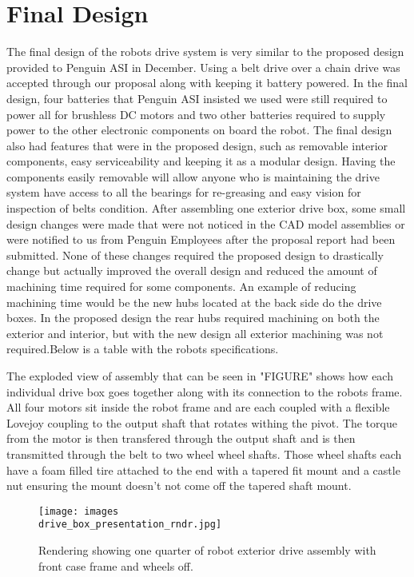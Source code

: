 \section{Final Design}
The final design of the robots drive system is very similar to the proposed design provided to Penguin ASI in December. Using a belt drive over a chain drive was accepted through our proposal along with keeping it battery powered. In the final design, four batteries that Penguin ASI insisted we used were still required to power all for brushless DC motors and two other batteries required to supply power to the other electronic components on board the robot. The final design also had features that were in the proposed design, such as removable interior components, easy serviceability and keeping it as a modular design. Having the components easily removable will allow anyone who is maintaining the drive system have access to all the bearings for re-greasing and easy vision for inspection of belts condition.  After assembling one exterior drive box, some small design changes were made that were not noticed in the CAD model assemblies or were notified to us from Penguin Employees after the proposal report had been submitted. None of these changes required the proposed design to drastically change but actually improved the overall design and reduced the amount of machining time required for some components. An example of reducing machining time would be the new hubs located at the back side do the drive boxes. In the proposed design the rear hubs required machining on both the exterior and interior, but with the new design all exterior machining was not required.Below is a table with the robots specifications.

The exploded view of assembly that can be seen in "FIGURE" shows how each individual drive box goes together along with its connection to the robots frame. All four motors sit inside the robot frame and are each coupled with a flexible Lovejoy coupling to the output shaft that rotates withing the pivot. The torque from the motor is then transfered through the output shaft and is then transmitted through the belt to two wheel wheel shafts. Those wheel shafts each have a foam filled tire attached to the end with a tapered fit mount and a castle nut ensuring the mount doesn't not come off the tapered shaft mount.
\begin{figure}
	\texttt{[image: images\\drive\_box\_presentation\_rndr.jpg]}
	\caption{Rendering showing one quarter of robot exterior drive assembly with front case frame and wheels off. }
	\label{fig:Assembly of quarter robot}
\end{figure}

